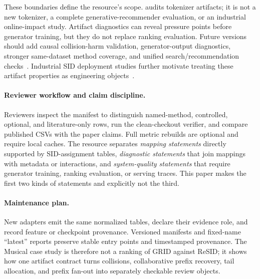 These boundaries define the resource's scope. \tool audits tokenizer
artifacts; it is not a new \sid tokenizer, a complete
generative-recommender evaluation, or an industrial online-impact study.
Artifact diagnostics can reveal pressure points before generator training, but
they do not replace ranking evaluation. Future versions should add causal
collision-harm validation, generator-output diagnostics, stronger same-dataset
method coverage, and unified search/recommendation checks~\cite{penha2025jointsid}.
Industrial SID deployment studies further motivate treating these artifact
properties as engineering objects~\cite{ju2026snapchatsid}.

\paragraph{Reviewer workflow and claim discipline.}
Reviewers inspect the manifest to distinguish named-method, controlled,
optional, and literature-only rows, run the clean-checkout verifier, and compare
published CSVs with the paper claims. Full metric rebuilds are optional and
require local caches. The resource separates \emph{mapping statements} directly
supported by SID-assignment tables, \emph{diagnostic statements} that join
mappings with metadata or interactions, and \emph{system-quality statements}
that require generator training, ranking evaluation, or serving traces. This
paper makes the first two kinds of statements and explicitly not the third.

\paragraph{Maintenance plan.}
New adapters emit the same normalized tables, declare their evidence role, and
record feature or checkpoint provenance. Versioned manifests and fixed-name
``latest'' reports preserve stable entry points and timestamped provenance. The
Musical case study is therefore not a ranking of GRID against ReSID; it shows
how one artifact contract turns collisions, collaborative prefix recovery, tail
allocation, and prefix fan-out into separately checkable review objects.
